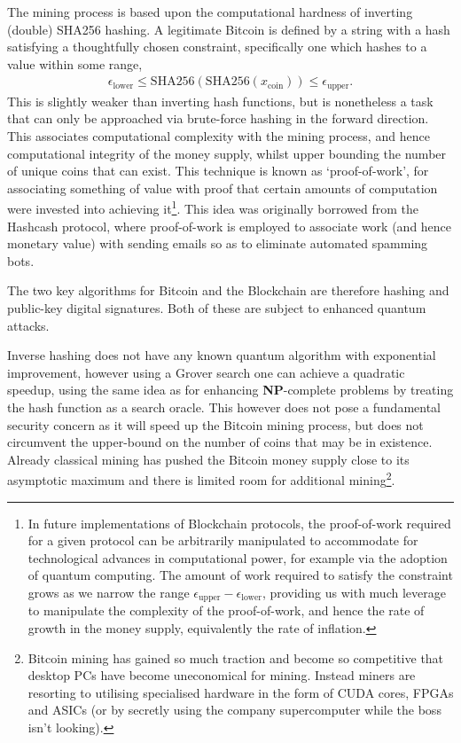 The mining process is based upon the computational hardness of inverting (double) SHA256 hashing. A legitimate Bitcoin is defined by a string with a hash satisfying a thoughtfully chosen constraint, specifically one which hashes to a value within some range,
\begin{align}
	\epsilon_\mathrm{lower}\leq \mathrm{SHA256}(\mathrm{SHA256}(x_\mathrm{coin})) \leq \epsilon_\mathrm{upper}.
\end{align}
This is slightly weaker than inverting hash functions, but is nonetheless a task that can only be approached via brute-force hashing in the forward direction. This associates computational complexity with the mining process, and hence computational integrity of the money supply, whilst upper bounding the number of unique coins that can exist. This technique is known as `proof-of-work', for associating something of value with proof that certain amounts of computation were invested into achieving it\footnote{In future implementations of Blockchain protocols, the proof-of-work required for a given protocol can be arbitrarily manipulated to accommodate for technological advances in computational power, for example via the adoption of quantum computing. The amount of work required to satisfy the constraint grows as we narrow the range \mbox{$\epsilon_\mathrm{upper}-\epsilon_\mathrm{lower}$}, providing us with much leverage to manipulate the complexity of the proof-of-work, and hence the rate of growth in the money supply, equivalently the rate of inflation.}. This idea was originally borrowed from the Hashcash protocol, where proof-of-work is employed to associate work (and hence monetary value) with sending emails so as to eliminate automated spamming bots.

The two key algorithms for Bitcoin and the Blockchain are therefore hashing and public-key digital signatures. Both of these are subject to enhanced quantum attacks.

Inverse hashing does not have any known quantum algorithm with exponential improvement, however using a Grover search one can achieve a quadratic speedup, using the same idea as for enhancing \textbf{NP}-complete problems by treating the hash function as a search oracle. This however does not pose a fundamental security concern as it will speed up the Bitcoin mining process, but does not circumvent the upper-bound on the number of coins that may be in existence. Already classical mining has pushed the Bitcoin money supply close to its asymptotic maximum and there is limited room for additional mining\footnote{Bitcoin mining has gained so much traction and become so competitive that desktop PCs have become uneconomical for mining. Instead miners are resorting to utilising specialised hardware in the form of CUDA cores, FPGAs and ASICs (or by secretly using the company supercomputer while the boss isn't looking).}.

